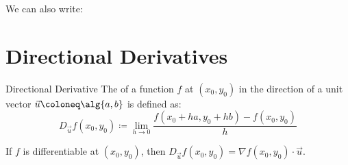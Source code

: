 We can also write:

\section{Directional Derivatives}

\begin{dfnbox}{Directional Derivative}{}
    The  of a function $f$ at $(x_0, y_0)$ in the direction of a unit vector $\vec{u} \coloneq \alg{a,b}$ is defined as:
    \[ D_{\vec{u}} f(x_0, y_0) \coloneq \lim_{h \to 0} \frac{f(x_0 + ha, y_0 + hb) - f(x_0, y_0)}{h} \]
\end{dfnbox}

\begin{thmbox}{}{}
    If $f$ is differentiable at $(x_0, y_0)$, then $D_{\vec{u}} f (x_0, y_0) = \nabla f(x_0, y_0) \cdot \vec{u}$.
\end{thmbox}
